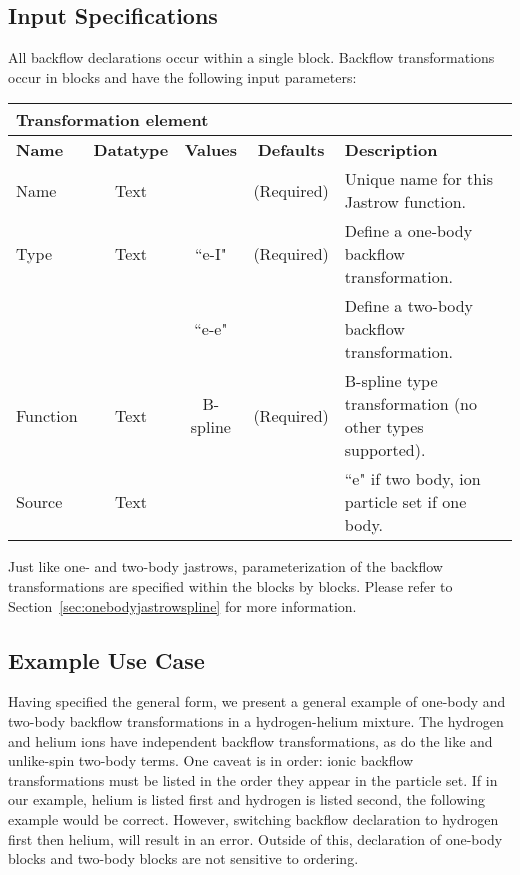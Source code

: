 \subsection{Input Specifications}
All backflow declarations occur within a single  block.  Backflow transformations occur in  blocks and have the following input parameters:

\begin{table}[h]
\begin{center}
\begin{tabular}{l c c c l }
\hline
\multicolumn{5}{l}{Transformation element} \\
\hline
\bfseries Name & \bfseries Datatype & \bfseries Values & \bfseries Defaults  & \bfseries Description \\
\hline
Name & Text &  & (Required) & Unique name for this Jastrow function. \\
Type & Text & ``e-I" & (Required) & Define a one-body backflow transformation. \\ 
        &          & ``e-e" & & Define a two-body backflow transformation. \\
Function & Text & B-spline & (Required) & B-spline type transformation (no other types supported). \\
Source & Text &  &  & ``e" if two body, ion particle set if one body.\\ 
  \hline
\end{tabular}
\end{center}
\end{table}

Just like one- and two-body jastrows, parameterization of the backflow transformations are specified within the  blocks by   blocks.  Please refer to Section~\ref{sec:onebodyjastrowspline} for more information.

\subsection{Example Use Case}
Having specified the general form, we present a general example of one-body and two-body backflow transformations in a hydrogen-helium mixture.  The hydrogen and helium ions have independent backflow transformations, as do the like and unlike-spin two-body terms.  One caveat is in order:  ionic backflow transformations must be listed in the order they appear in the particle set.  If in our example, helium is listed first and hydrogen is listed second, the following example would be correct.  However, switching backflow declaration to hydrogen first then helium, will result in an error.  Outside of this, declaration of one-body blocks and two-body blocks are not sensitive to ordering.  

